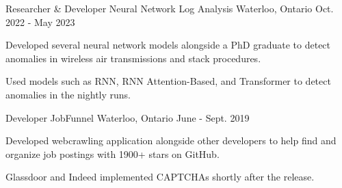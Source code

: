 
\begin{cventries}
  \cventry
    {Researcher \& Developer} %
    {Neural Network Log Analysis} %
    {Waterloo, Ontario} %
    {Oct. 2022 - May 2023} %
    {
      \begin{cvitems} %
        \item {Developed several neural network models alongside a PhD graduate to detect anomalies in wireless air transmissions and stack procedures.}
        \item {Used models such as RNN, RNN Attention-Based, and Transformer to detect anomalies in the nightly runs.}
      \end{cvitems}
    }

\cventry
  {Developer} %
  {JobFunnel} %
  {Waterloo, Ontario} %
  {June - Sept. 2019} %
  {
    \begin{cvitems} %
      \item {Developed webcrawling application alongside other developers to help find and organize job postings with 1900+ stars on GitHub.}
      \item {Glassdoor and Indeed implemented CAPTCHAs shortly after the release. }
    \end{cvitems}
  }



\end{cventries}
